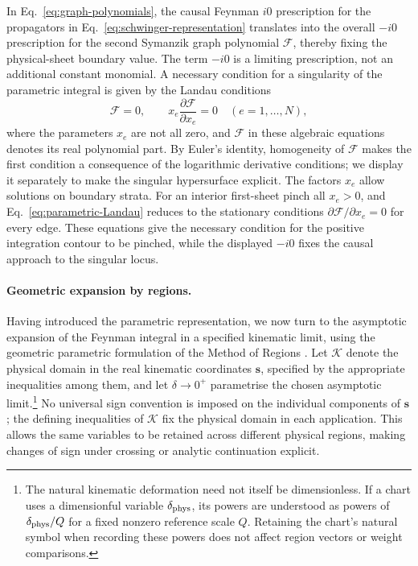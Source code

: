 \documentclass[a4paper,11pt]{article}
\newcommand{\s}{\boldsymbol{s}}
\newcommand{\K}{\mathcal K}
\begin{document}
In Eq.~\eqref{eq:graph-polynomials}, the causal Feynman \(i0\) prescription
for the propagators in
Eq.~\eqref{eq:schwinger-representation} translates into the overall \(-i0\)
prescription for the second Symanzik graph polynomial \(\mathcal F\), thereby
fixing the physical-sheet boundary value.  The term \(-i0\) is a limiting
prescription, not an additional constant monomial.  A necessary condition
for a singularity of the parametric integral is given by the Landau
conditions \cite{Lnd59,Collins:2020euz,Weinzierl:2022eaz}
\begin{equation}
 \mathcal F=0,
 \qquad
 x_e\frac{\partial\mathcal F}{\partial x_e}=0
 \quad(e=1,\ldots,N),
 \label{eq:parametric-Landau}
\end{equation}
where the parameters \(x_e\) are not all zero, and \(\mathcal F\) in these
algebraic equations denotes its real polynomial part.  By Euler's identity,
homogeneity of \(\mathcal F\) makes the first condition a consequence of the
logarithmic derivative conditions; we display it separately to make the
singular hypersurface explicit.  The factors \(x_e\) allow solutions on
boundary strata.  For an interior first-sheet pinch all
\(x_e>0\), and
Eq.~\eqref{eq:parametric-Landau} reduces to the stationary conditions
\(\partial\mathcal F/\partial x_e=0\) for every edge.  These equations give
the necessary condition for the positive integration contour to be pinched,
while the displayed \(-i0\) fixes the causal approach to the singular locus.

\paragraph{Geometric expansion by regions.}

Having introduced the parametric representation, we now turn to the
asymptotic expansion of the Feynman integral in a specified kinematic limit,
using the geometric parametric formulation of the Method of Regions
\cite{Pak:2010pt,Jantzen:2012mw,Ananthanarayan:2018tog,Heinrich:2021dbf}.
Let \(\K\) denote the physical domain in the real kinematic coordinates
\(\s\), specified by the appropriate inequalities among them, and let
\(\delta\to0^+\) parametrise the chosen asymptotic limit.\footnote{The natural
kinematic deformation need not itself be dimensionless.  If a chart uses a
dimensionful variable \(\delta_{\rm phys}\), its powers are understood as
powers of \(\delta_{\rm phys}/Q\) for a fixed nonzero reference scale \(Q\).
Retaining the chart's natural symbol when recording these powers does not
affect region vectors or weight comparisons.}  No universal sign
convention is imposed on the individual components of \(\s\); the defining
inequalities of \(\K\) fix the physical domain in each application.  This
allows the same variables to
be retained across different physical regions, making changes of sign under
crossing or analytic continuation explicit.
\end{document}
